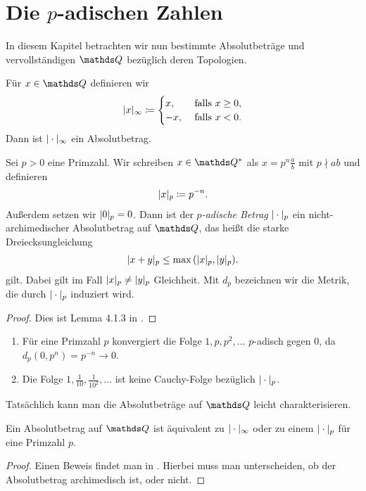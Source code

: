 \chapter{Die $p$-adischen Zahlen}
In diesem Kapitel betrachten wir nun bestimmte Absolutbeträge und vervollständigen $\Q$ bezüglich deren Topologien.

Für $x\in \Q$ definieren wir
\begin{align*}
|x|_\infty\coloneqq\begin{cases}
x, &\text{ falls } x\geq 0,\\
-x, &\text{ falls } x<0.
\end{cases}
\end{align*}
Dann ist $|\cdot|_\infty$ ein Absolutbetrag.

\begin{lem}
Sei $p>0$ eine Primzahl. Wir schreiben $x\in \Q^\ast$ als $x=p^n \frac{a}{b}$ mit $p \nmid ab$ und definieren
\begin{align*}
|x|_p \coloneqq p^{-n}.
\end{align*}
Außerdem setzen wir $|0|_p=0$.
Dann ist der \emph{$p$-adische Betrag} $|\cdot|_p$ ein nicht-archimedischer Absolutbetrag auf $\Q$, das heißt die starke Dreiecksungleichung
\begin{align*}
|x+y|_p\leq \max{(|x|_p,|y|_p)}.
\end{align*}
gilt. Dabei gilt im Fall $|x|_p \not= |y|_p$ Gleichheit.
Mit $d_p$ bezeichnen wir die Metrik, die durch $|\cdot|_p$ induziert wird.
\end{lem}
\begin{proof}
Dies ist Lemma 4.1.3 in \cite{Deitmar}.
\end{proof}

\begin{bsp}
\begin{enumerate}[label=\roman*)]
\item Für eine Primzahl $p$ konvergiert die Folge $1,p,p^2,\dots$ $p$-adisch gegen $0$, da $d_p(0,p^n)=p^{-n}\to 0$.
\item Die Folge $1,\frac{1}{10},\frac{1}{10^2},\dots$ ist keine Cauchy-Folge bezüglich $|\cdot|_p$.
\end{enumerate}
\end{bsp}

Tatsächlich kann man die Absolutbeträge auf $\Q$ leicht charakterisieren.
\begin{thm}[Ostrowski]
Ein Absolutbetrag auf $\Q$ ist äquivalent zu $|\cdot|_\infty$ oder zu einem $|\cdot|_p$ für eine Primzahl $p$.
\end{thm}
\begin{proof}
Einen Beweis findet man in \cite[Theorem 3.1.3]{Gouvea}.
Hierbei muss man unterscheiden, ob der Absolutbetrag archimedisch ist, oder nicht. 
\end{proof}


